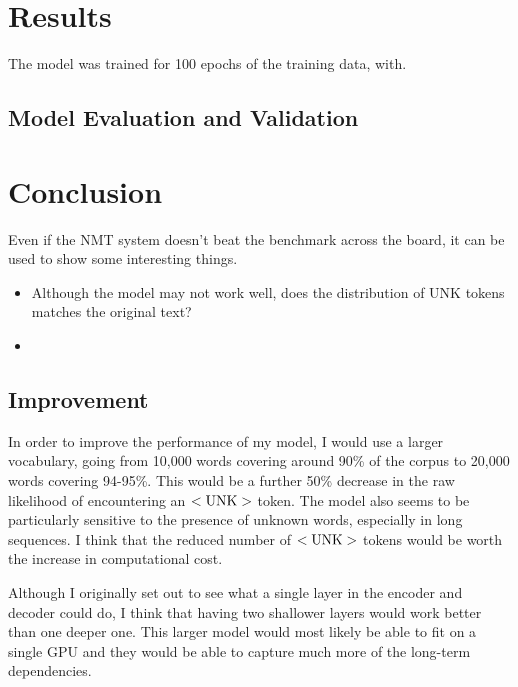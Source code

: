 \documentclass[]{article}
\begin{document}
\section{Results}
The model was trained for 100 epochs of the training data, with.
\subsection{Model Evaluation and Validation}

\section{Conclusion}
Even if the NMT system doesn't beat the benchmark across the board, it can be used to show some interesting things.
\begin{itemize}
	\item Although the model may not work well, does the distribution of UNK tokens matches the original text?
	\item 
\end{itemize}
\subsection{Improvement}
In order to improve the performance of my model, I would use a larger vocabulary, going from 10,000 words covering around 90\% of the corpus to 20,000 words covering 94-95\%. This would be a further 50\% decrease in the raw likelihood of encountering an $<\textnormal{UNK}>$ token. The model also seems to be particularly sensitive to the presence of unknown words, especially in long sequences. I think that the reduced number of $<\textnormal{UNK}>$ tokens would be worth the increase in computational cost.

Although I originally set out to see what a single layer in the encoder and decoder could do, I think that having two shallower layers would work better than one deeper one. This larger model would most likely be able to fit on a single GPU and they would be able to capture much more of the long-term dependencies.
\end{document}
